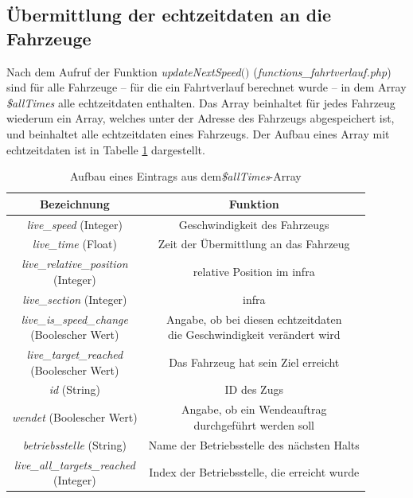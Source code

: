 \subsection{Übermittlung der \Gls{echtzeitdaten} an die Fahrzeuge} \label{main_4}
Nach dem Aufruf der Funktion \textit{updateNextSpeed$($$)$} (\textit{functions\_fahrtverlauf.php}) sind für alle Fahrzeuge -- für die ein Fahrtverlauf berechnet wurde -- in dem Array \textit{\$allTimes} alle \Gls{echtzeitdaten} enthalten. Das Array beinhaltet für jedes Fahrzeug wiederum ein Array, welches unter der Adresse des Fahrzeugs abgespeichert ist, und beinhaltet alle \Gls{echtzeitdaten} eines Fahrzeugs. Der Aufbau eines Array mit \Gls{echtzeitdaten} ist in Tabelle \ref{table:aufbauAllTimes} dargestellt.
\begin{table}
\begin{center}
\renewcommand{\arraystretch}{1.4}
\begin{tabular}{c|c}
Bezeichnung & Funktion \\ \hline
\textit{live\_speed} (Integer)                  		&    Geschwindigkeit des Fahrzeugs                \\ \hline
\textit{live\_time} (Float)                  		&    Zeit der Übermittlung an das Fahrzeug                 \\ \hline
\makecell{\textit{live\_relative\_position}\\(Integer)}                  		&    relative Position im \ac{infra}                \\ \hline
\textit{live\_section} (Integer)                  		&    \ac{infra}                \\ \hline
\makecell{\textit{live\_is\_speed\_change}\\(Boolescher Wert)}                  		&    \makecell{Angabe, ob bei diesen \Gls{echtzeitdaten}\\die Geschwindigkeit verändert wird}                \\ \hline
\makecell{\textit{live\_target\_reached}\\(Boolescher Wert)}                  		&    Das Fahrzeug hat sein Ziel erreicht                \\ \hline
\textit{id} (String)                  		&    ID des Zugs                \\ \hline
\textit{wendet} (Boolescher Wert)                  		&    \makecell{Angabe, ob ein Wendeauftrag\\durchgeführt werden soll}                \\ \hline
\textit{betriebsstelle} (String)                  		&    Name der Betriebsstelle des nächsten Halts                \\ \hline
\makecell{\textit{live\_all\_targets\_reached}\\(Integer)}                  		&    Index der Betriebsstelle, die erreicht wurde                \\ 
\end{tabular}
\renewcommand{\arraystretch}{1}
\caption{Aufbau eines Eintrags aus dem\textit{\$allTimes}-Array}
\label{table:aufbauAllTimes}
\end{center}
\end{table}
